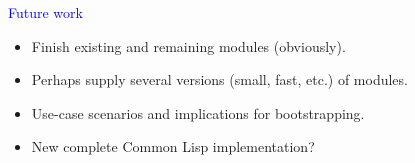 \documentclass{slides}
\newcommand{\ti}[1]{\begin{center}\Large{\textcolor{blue}{#1}}\end{center}}
\begin{document}
\begin{slide}\ti{}

\vfill\end{slide}
\begin{slide}\ti{Future work}

\begin{itemize}
\item Finish existing and remaining modules (obviously).
\item Perhaps supply several versions (small, fast, etc.) of modules.
\item Use-case scenarios and implications for bootstrapping. 
\item New complete Common Lisp implementation?
\end{itemize}

\vfill\end{slide}
\begin{slide}\ti{}

\vfill\end{slide}
\begin{slide}\ti{}

\vfill\end{slide}
\begin{slide}\ti{}

\vfill\end{slide}
\end{document}
